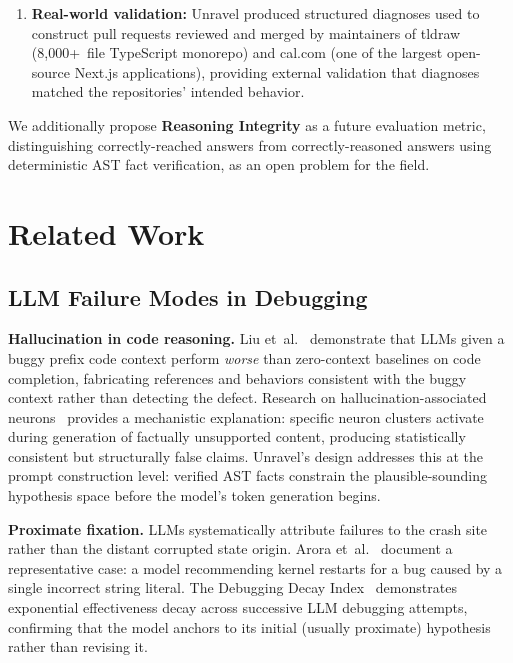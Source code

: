 \documentclass[12pt,a4paper]{article}
\newcommand{\code}[1]{\texttt{\small #1}}
\begin{document}
\begin{contribbox}
\begin{enumerate}[leftmargin=1.8em, itemsep=4pt]
        specified solvability check that identifies when the root cause originates upstream
        of the provided codebase (\code{LAYER\_BOUNDARY}), and a complementary verdict
        (\code{EXTERNAL\_FIX\_TARGET}) that preserves the full diagnosis when the fix
        target resides in a different repository.
  \item \textbf{Real-world validation:} Unravel produced structured diagnoses used to
        construct pull requests reviewed and merged by maintainers of tldraw (8,000+~file
        TypeScript monorepo) and cal.com (one of the largest open-source Next.js
        applications), providing external validation that diagnoses matched the
        repositories' intended behavior.
\end{enumerate}
\end{contribbox}

We additionally propose \textbf{Reasoning Integrity} as a future evaluation metric,
distinguishing correctly-reached answers from correctly-reasoned answers using deterministic
AST fact verification, as an open problem for the field.

\section{Related Work}

\subsection{LLM Failure Modes in Debugging}

\textbf{Hallucination in code reasoning.} Liu et~al.~\cite{liu2023} demonstrate that LLMs
given a buggy prefix code context perform \textit{worse} than zero-context baselines on code
completion, fabricating references and behaviors consistent with the buggy context rather
than detecting the defect. Research on hallucination-associated neurons~\cite{chen2024}
provides a mechanistic explanation: specific neuron clusters activate during generation of
factually unsupported content, producing statistically consistent but structurally false
claims. Unravel's design addresses this at the prompt construction level: verified AST facts
constrain the plausible-sounding hypothesis space before the model's token generation begins.

\textbf{Proximate fixation.} LLMs systematically attribute failures to the crash site
rather than the distant corrupted state origin. Arora et~al.~\cite{arora2026} document a
representative case: a model recommending kernel restarts for a bug caused by a single
incorrect string literal. The Debugging Decay Index~\cite{debuggingdecay2026} demonstrates
exponential effectiveness decay across successive LLM debugging attempts, confirming that
the model anchors to its initial (usually proximate) hypothesis rather than revising it.
\end{document}
